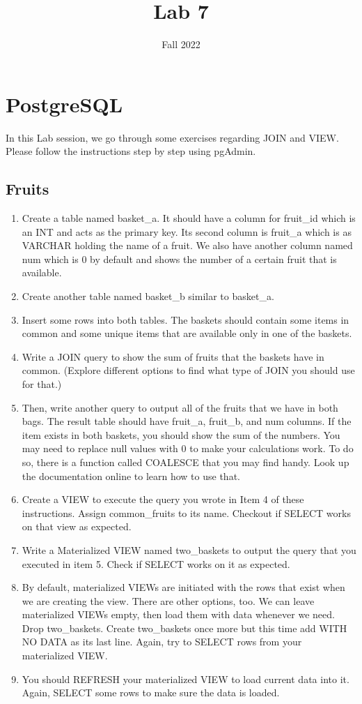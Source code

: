 \documentclass{homework}
\author{}
\date{Fall 2022}
\title{Lab 7}
\begin{document}
 \maketitle

\section*{PostgreSQL}

In this Lab session, we go through some exercises regarding JOIN and VIEW. Please follow the instructions step by step using pgAdmin.
\subsection*{Fruits}
\begin{enumerate}
    \item Create a table named basket\_a. It should have a column for fruit\_id which is an INT and acts as the primary key. Its second column is fruit\_a which is as VARCHAR holding the name of a fruit. We also have another column named num which is 0 by default and shows the number of a certain fruit that is available.
    \item Create another table named basket\_b similar to basket\_a.
    \item Insert some rows into both tables. The baskets should contain some items in common and some unique items that are available only in one of the baskets.
    \item Write a JOIN query to show the sum of fruits that the baskets have in common. (Explore different options to find what type of JOIN you should use for that.)
    \item Then, write another query to output all of the fruits that we have in both bags. The result table should have fruit\_a, fruit\_b, and num columns. If the item exists in both baskets, you should show the sum of the numbers.
    You may need to replace null values with 0 to make your calculations work. To do so, there is a function called COALESCE that you may find handy. Look up the documentation online to learn how to use that.
    \item Create a VIEW to execute the query you wrote in Item 4 of these instructions. Assign common\_fruits to its name. Checkout if SELECT works on that view as expected.
    \item Write a Materialized VIEW named two\_baskets to output the query that you executed in item 5. Check if SELECT works on it as expected.
    \item By default, materialized VIEWs are initiated with the rows that exist when we are creating the view. There are other options, too. We can leave materialized VIEWs empty, then load them with data whenever we need. Drop two\_baskets. Create two\_baskets once more but this time add WITH NO DATA as its last line. Again, try to SELECT rows from your materialized VIEW.
    \item You should REFRESH your materialized VIEW to load current data into it. Again, SELECT some rows to make sure the data is loaded.
\end{enumerate}
\end{document}
